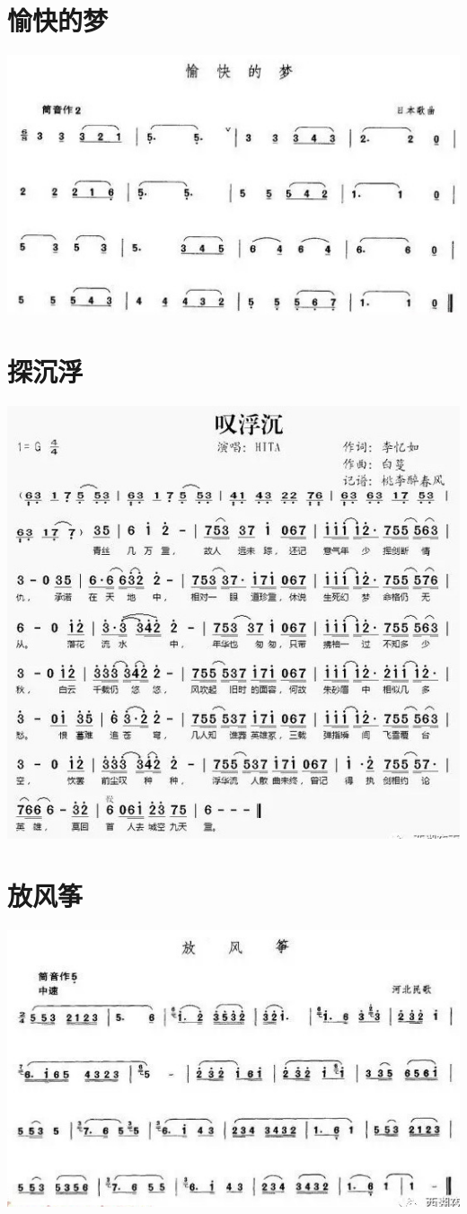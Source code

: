 \documentclass[cn,pad,twocol]{elegantbook}
\begin{document}
\section{愉快的梦}\includegraphics[width=\textwidth]{dongxiao/20200819/愉快的梦.jpeg}
\section{探沉浮}\includegraphics[width=\textwidth]{dongxiao/20200819/探沉浮.jpeg}
\section{放风筝}\includegraphics[width=\textwidth]{dongxiao/20200819/放风筝.jpeg}
\end{document}
